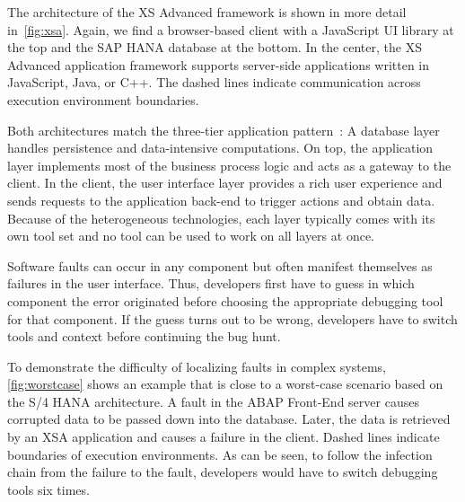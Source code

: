 The architecture of the XS Advanced framework is shown in more detail in~\cref{fig:xsa}.
Again, we find a browser-based client with a JavaScript UI library at the top and the SAP HANA database at the bottom.
In the center, the XS Advanced application framework supports server-side applications written in JavaScript, Java, or C++.
The dashed lines indicate communication across execution environment boundaries.

Both architectures match the three-tier application pattern~\cite{fowler02:patterns_of_enterprise_application}:
A database layer handles persistence and data-intensive computations.
On top, the application layer implements most of the business process logic and acts as a gateway to the client.
In the client, the user interface layer provides a rich user experience and sends requests to the application back-end to trigger actions and obtain data.
Because of the heterogeneous technologies, each layer typically comes with its own tool set and no tool can be used to work on all layers at once.


Software faults can occur in any component but often manifest themselves as failures in the user interface.
Thus, developers first have to guess in which component the error originated before choosing the appropriate debugging tool for that component.
If the guess turns out to be wrong, developers have to switch tools and context before continuing the bug hunt.

To demonstrate the difficulty of localizing faults in complex systems, \ref{fig:worstcase} shows an example that is close to a worst-case scenario based on the S/4 HANA architecture.
A fault in the ABAP Front-End server causes corrupted data to be passed down into the database.
Later, the data is retrieved by an XSA application and causes a failure in the client.
Dashed lines indicate boundaries of execution environments.
As can be seen, to follow the infection chain from the failure to the fault, developers would have to switch debugging tools six times.

